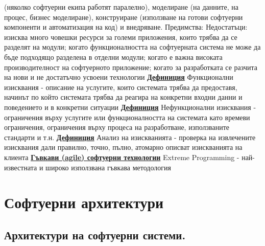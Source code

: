\documentclass{article}
\begin{document}
(няколко софтуерни екипа работят паралелно), моделиране (на данните, на процес, бизнес моделиране), конструиране (използване на
готови софтуерни компоненти и автоматизация на код) и внедряване. \newline
Предимства: \newline
Недостатъци: изисква много човешки ресурси за големи приложения, които трябва да се разделят на модули; когато функционалността
на софтуерната система не може да бъде подходящо разделена в отделни модули; когато е важна високата производителност на
софтуерното приложение; когато за разработката се разчита на нови и не достатъчно усвоени технологии
\textbf{\underline{Дефиниция}}
Функционални изисквания - описание на услугите, които системата трябва да предоставя, начинът по който системата трябва да реагира
на конкретни входни данни и поведението и в конкретни ситуации
\textbf{\underline{Дефиниция}}
Нефункционални изисквания - ограничения върху услугите или функционалността на системата като времеви ограничения, ограничения
върху процеса на разработване, използваните стандарти и т.н.
\textbf{\underline{Дефиниция}}
Анализ на изискванията - проверка на извлечените изисквания дали правилно, точно, пълно, атомарно описват изискванията на клиента
\textbf{\underline{Гъвкави (agile) софтуерни технологии}}
Extreme Programming - най-известната и широко използвана гъвкава методология

\section*{Софтуерни архитектури}

\subsection*{Архитектури на софтуерни системи.}
\end{document}
